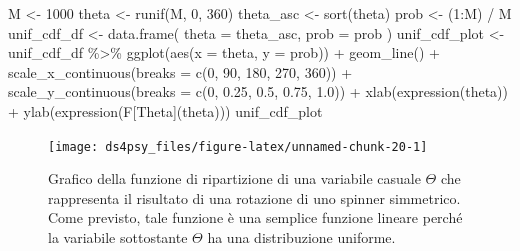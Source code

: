 \documentclass[
  11pt,
]{krantz}
\makeatletter
\newenvironment{Shaded}{\begin{snugshade}}{\end{snugshade}}
\newcommand{\AttributeTok}[1]{\textcolor[rgb]{0.61,0.61,0.61}{#1}}
\newcommand{\DecValTok}[1]{\textcolor[rgb]{0.06,0.06,0.06}{#1}}
\newcommand{\FloatTok}[1]{\textcolor[rgb]{0.06,0.06,0.06}{#1}}
\newcommand{\FunctionTok}[1]{\textcolor[rgb]{0,0,0}{#1}}
\newcommand{\NormalTok}[1]{#1}
\newcommand{\OtherTok}[1]{\textcolor[rgb]{0.37,0.37,0.37}{#1}}
\newcommand{\SpecialCharTok}[1]{\textcolor[rgb]{0,0,0}{#1}}
\newenvironment{kframe}{%
\medskip{}
\setlength{\fboxsep}{.8em}
 \def\at@end@of@kframe{}%
 \ifinner\ifhmode%
  \def\at@end@of@kframe{\end{minipage}}%
  \begin{minipage}{\columnwidth}%
 \fi\fi%
 \def\FrameCommand##1{\hskip\@totalleftmargin \hskip-\fboxsep
 \colorbox{shadecolor}{##1}\hskip-\fboxsep
     \hskip-\linewidth \hskip-\@totalleftmargin \hskip\columnwidth}%
 \MakeFramed {\advance\hsize-\width
   \@totalleftmargin\z@ \linewidth\hsize
   \@setminipage}}%
 {\par\unskip\endMakeFramed%
 \at@end@of@kframe}
\renewenvironment{Shaded}{\begin{kframe}}{\end{kframe}}
\theoremstyle{definition}
\theoremstyle{definition}
\theoremstyle{definition}
\theoremstyle{definition}
\theoremstyle{remark}
\makeatother
\begin{document}
\begin{Shaded}
\begin{Highlighting}[]
\NormalTok{M }\OtherTok{\textless{}{-}} \DecValTok{1000}
\NormalTok{theta }\OtherTok{\textless{}{-}} \FunctionTok{runif}\NormalTok{(M, }\DecValTok{0}\NormalTok{, }\DecValTok{360}\NormalTok{)}
\NormalTok{theta\_asc }\OtherTok{\textless{}{-}} \FunctionTok{sort}\NormalTok{(theta)}
\NormalTok{prob }\OtherTok{\textless{}{-}}\NormalTok{ (}\DecValTok{1}\SpecialCharTok{:}\NormalTok{M) }\SpecialCharTok{/}\NormalTok{ M}
\NormalTok{unif\_cdf\_df }\OtherTok{\textless{}{-}} \FunctionTok{data.frame}\NormalTok{(}
  \AttributeTok{theta =}\NormalTok{ theta\_asc,}
  \AttributeTok{prob =}\NormalTok{ prob}
\NormalTok{)}
\NormalTok{unif\_cdf\_plot }\OtherTok{\textless{}{-}}
\NormalTok{  unif\_cdf\_df }\SpecialCharTok{\%\textgreater{}\%}
  \FunctionTok{ggplot}\NormalTok{(}\FunctionTok{aes}\NormalTok{(}\AttributeTok{x =}\NormalTok{ theta, }\AttributeTok{y =}\NormalTok{ prob)) }\SpecialCharTok{+}
  \FunctionTok{geom\_line}\NormalTok{() }\SpecialCharTok{+}
  \FunctionTok{scale\_x\_continuous}\NormalTok{(}\AttributeTok{breaks =} \FunctionTok{c}\NormalTok{(}\DecValTok{0}\NormalTok{, }\DecValTok{90}\NormalTok{, }\DecValTok{180}\NormalTok{, }\DecValTok{270}\NormalTok{, }\DecValTok{360}\NormalTok{)) }\SpecialCharTok{+}
  \FunctionTok{scale\_y\_continuous}\NormalTok{(}\AttributeTok{breaks =} \FunctionTok{c}\NormalTok{(}\DecValTok{0}\NormalTok{, }\FloatTok{0.25}\NormalTok{, }\FloatTok{0.5}\NormalTok{, }\FloatTok{0.75}\NormalTok{, }\FloatTok{1.0}\NormalTok{)) }\SpecialCharTok{+}
  \FunctionTok{xlab}\NormalTok{(}\FunctionTok{expression}\NormalTok{(theta)) }\SpecialCharTok{+}
  \FunctionTok{ylab}\NormalTok{(}\FunctionTok{expression}\NormalTok{(F[Theta](theta)))}
\NormalTok{unif\_cdf\_plot}
\end{Highlighting}
\end{Shaded}

\begin{figure}

{\centering \texttt{[image: ds4psy\_files/figure-latex/unnamed-chunk-20-1]} 

}

\caption{Grafico della funzione di ripartizione di una variabile casuale $\Theta$ che rappresenta il risultato di una rotazione di uno spinner simmetrico. Come previsto, tale funzione è una semplice funzione lineare perché la variabile sottostante $\Theta$ ha una distribuzione uniforme.}\label{fig:unnamed-chunk-20}
\end{figure}
\end{document}
